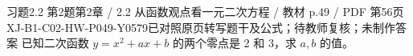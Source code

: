 \par\noindent\begin{minipage}{\linewidth}
\begin{bankitem}{习题2.2 第2题}{第2章 / 2.2 从函数观点看一元二次方程 / 教材 p.49 / PDF 第56页}{XJ-B1-C02-HW-P049-Y0579}{已对照原页转写题干及公式；待教师复核；未制作答案}
已知二次函数 $y=x^2+ax+b$ 的两个零点是 2 和 3，求 $a,b$ 的值。
\end{bankitem}
\end{minipage}\par\medskip
